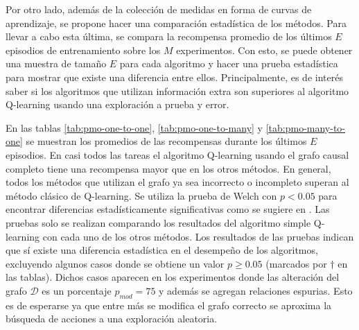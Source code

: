 Por otro lado, además de la colección de medidas en forma de curvas de aprendizaje, se propone hacer una comparación estadística de
los métodos. Para llevar a cabo esta última, se compara la recompensa promedio de los últimos $E$ episodios
de entrenamiento sobre los $M$ experimentos. Con esto, se 
puede obtener una muestra de tamaño $E$ para cada algoritmo
y hacer una prueba estadística para mostrar que existe una diferencia entre ellos. Principalmente, es de interés saber si los algoritmos que utilizan información extra son superiores 
al algoritmo Q-learning usando una exploración a prueba y error. 

En las tablas \ref{tab:pmo-one-to-one}, \ref{tab:pmo-one-to-many} y \ref{tab:pmo-many-to-one} se muestran
los promedios de las recompensas durante los últimos $E$ episodios. En casi todos las tareas el algoritmo Q-learning usando el grafo causal completo tiene una recompensa mayor que en los otros métodos. En general, todos los métodos que utilizan el grafo ya sea incorrecto o incompleto superan al método clásico de Q-learning. Se utiliza la prueba de Welch con $p < 0.05$ para encontrar diferencias estadísticamente significativas como se sugiere en \cite{colas2019hitchhikers}. Las pruebas solo se realizan comparando los resultados del algoritmo simple Q-learning con cada uno de los otros métodos. Los resultados de las pruebas indican que sí existe una diferencia estadística en el desempeño de los algoritmos, excluyendo algunos casos donde se obtiene un valor $p\geq 0.05$ (marcados por $\dagger$ en las tablas). Dichos casos aparecen en los experimentos donde las alteración del grafo $\mathcal{D}$ es un porcentaje $p_{mod} = 75$ y además se agregan relaciones espurias. Esto es de esperarse ya que entre más se modifica el grafo correcto se aproxima la búsqueda de acciones a una exploración aleatoria.
\newpage

